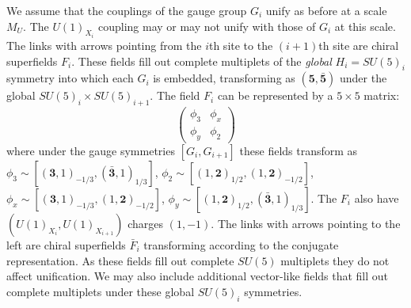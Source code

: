 \documentclass[a4paper,prl,twocolumn]{revtex4}
\begin{document}
We assume that the couplings of the gauge group $G_i$ unify as before
at a scale $M_U$.  The $U(1)_{X_i}$ coupling may or may not unify with
those of $G_i$ at this scale.  The links with arrows pointing from the
$i$th site to the $(i+1)$th site are chiral superfields $F_i$.
These
fields fill out complete multiplets of the {\em global} $H_i=SU(5)_i$
symmetry into which each $G_i$ is embedded, transforming as
$(\mathbf{5},\mathbf{\bar 5})$ under the global $SU(5)_i \times
SU(5)_{i+1}$.
The
field $F_i$ can be represented by a $5\times 5$ matrix:
\begin{equation}
  \label{eq:6}
  \begin{pmatrix}
    \phi_3  & \phi_x \\
    \phi_y & \phi_2
  \end{pmatrix}
\end{equation}
where under the gauge symmetries $[G_i, G_{i+1}]$ these fields
transform as $\phi_3 \sim \left[(\mathbf{3},1)_{-1/3},(\mathbf{\bar
    3},1)_{1/3}\right]$, $\phi_2 \sim
\left[(1,\mathbf{2})_{1/2},(1,\mathbf{2})_{-1/2}\right]$, $\phi_x \sim
\left[(\mathbf{3},1)_{-1/3}, (1,\mathbf{2})_{-1/2}\right]$, $\phi_y
\sim \left[(1,\mathbf{2})_{1/2},(\mathbf{\bar 3},1)_{1/3}\right]$.
The $F_i$ also have $(U(1)_{X_i},U(1)_{X_{i+1}})$ charges $(1,-1)$.
The links with arrows pointing to the left are chiral superfields
$\bar F_i$ transforming according to the conjugate representation.  As
these fields fill out complete $SU(5)$ multiplets they do not affect
unification.  We may also include additional vector-like fields that
fill out complete multiplets under these global $SU(5)_i$ symmetries.
\end{document}
